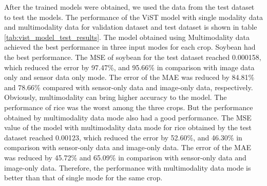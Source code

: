 \documentclass[acmsmall,manuscript, screen, review]{acmart}
\begin{document}
  After the trained models were obtained, we used the data from the test dataset to test the models.
  The performance of the ViST model with single modality data and multimodality data for validation dataset and test dataset is shown in table \ref{tab:vist_model_test_results}. The model obtained using Multimodality data achieved the best performance in three input modes for each crop. Soybean had the best performance. The MSE of soybean for the test dataset reached 0.000158, which reduced the error by 97.47\%, and 95.66\% in comparison with image data only and sensor data only mode. The error of the MAE was reduced by 84.81\% and 78.66\% compared with sensor-only data and image-only data, respectively. Obviously, multimodality can bring higher accuracy to the model. The performance of rice was the worst among the three crops. But the performance obtained by multimodality data mode also had a good performance. The MSE value of the model with multimodality data mode for rice obtained by the test dataset reached 0.00123, which reduced the error by 52.60\%, and 46.30\% in comparison with sensor-only data and image-only data. The error of the MAE was reduced by 45.72\% and 65.09\% in comparison with sensor-only data and image-only data. Therefore, the performance with multimodality data mode is better than that of single mode for the same crop.
\end{document}
